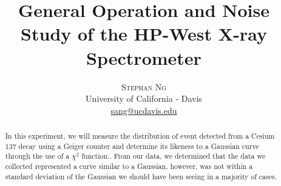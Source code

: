 \documentclass[twoside]{article}
\title{\vspace{-15mm}\fontsize{24pt}{10pt}\selectfont\textbf{General Operation and Noise Study of the HP-West X-ray Spectrometer}} %
\author{
\large
\textsc{Stephan Ng}\\[2mm] %
\normalsize University of California - Davis \\ %
\normalsize \href{mailto:sang@ucdavis.edu}{sang@ucdavis.edu} %
\vspace{-5mm}
}
\date{}
\begin{document}


\maketitle

\thispagestyle{fancy} %


\begin{abstract}

\noindent 
In this experiment, we will measure the distribution of event detected from a Cesium 137 decay using a Geiger counter and determine its likeness to a Gaussian curve through the use of a $\chi ^ 2$ function.. From our data, we determined that the data we collected represented a curve similar to a Gaussian, however, was not within a standard deviation of the Gaussian we should have been seeing in a majority of cases.  

\end{abstract}
\end{document}
